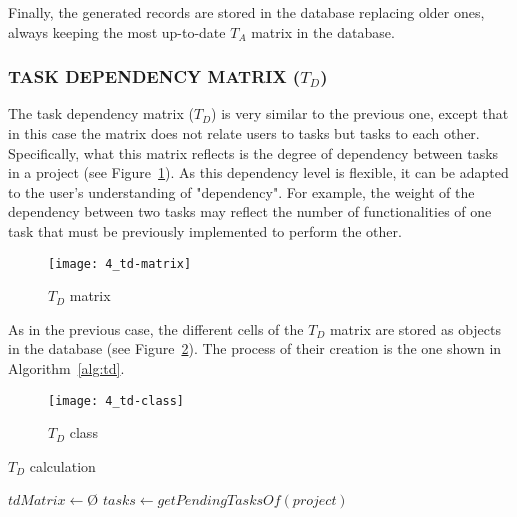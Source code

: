 Finally, the generated records are stored in the database replacing older ones, always keeping the most up-to-date $T_A$ matrix in the database.

\subsubsection{TASK DEPENDENCY MATRIX ($T_D$)}

The task dependency matrix ($T_D$) is very similar to the previous one, except that in this case the matrix does not relate users to tasks but tasks to each other. Specifically, what this matrix reflects is the degree of dependency between tasks in a project (see Figure~\ref{fig:td-matrix}). As this dependency level is flexible, it can be adapted to the user's understanding of "dependency". For example, the weight of the dependency between two tasks may reflect the number of functionalities of one task that must be previously implemented to perform the other.

\begin{figure}
	\centering
	\texttt{[image: 4\_td-matrix]}
	\caption[$T_D$ matrix]{$T_D$ matrix}
	\label{fig:td-matrix}
\end{figure}

As in the previous case, the different cells of the $T_D$ matrix are stored as objects in the database (see Figure~\ref{fig:td-class}). The process of their creation is the one shown in Algorithm~\ref{alg:td}.

\begin{figure}
	\centering
	\texttt{[image: 4\_td-class]}
	\caption[$T_D$ class]{$T_D$ class}
	\label{fig:td-class}
\end{figure}

\begin{algorithm}
    
    \DontPrintSemicolon
    
    \caption{$T_D$ calculation}
    \label{alg:td}
        
        $tdMatrix \longleftarrow $\O$ $\;
        $tasks \longleftarrow getPendingTasksOf(project) $\;
        
    
\end{algorithm}

